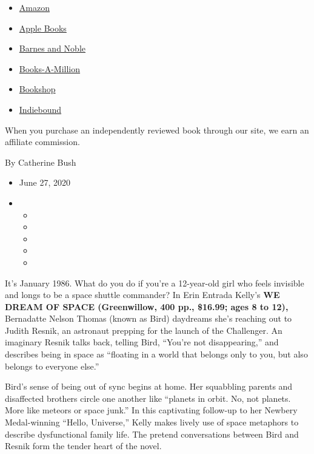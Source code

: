 \begin{itemize}
\tightlist
\item
  \href{https://www.amazon.com/gp/search?index=books\&tag=NYTBSREV-20\&field-keywords=We+Dream+of+Space+Erin+Entrada+Kelly}{Amazon}
\item
  \href{https://du-gae-books-dot-nyt-du-prd.appspot.com/buy?title=We+Dream+of+Space\&author=Erin+Entrada+Kelly}{Apple
  Books}
\item
  \href{https://www.anrdoezrs.net/click-7990613-11819508?url=https\%3A\%2F\%2Fwww.barnesandnoble.com\%2Fw\%2F\%3Fean\%3D9780062747303}{Barnes
  and Noble}
\item
  \href{https://www.anrdoezrs.net/click-7990613-35140?url=https\%3A\%2F\%2Fwww.booksamillion.com\%2Fp\%2FWe\%2BDream\%2Bof\%2BSpace\%2FErin\%2BEntrada\%2BKelly\%2F9780062747303}{Books-A-Million}
\item
  \href{https://bookshop.org/a/3546/9780062747303}{Bookshop}
\item
  \href{https://www.indiebound.org/book/9780062747303?aff=NYT}{Indiebound}
\end{itemize}

When you purchase an independently reviewed book through our site, we
earn an affiliate commission.

By Catherine Bush

\begin{itemize}
\item
  June 27, 2020
\item
  \begin{itemize}
  \item
  \item
  \item
  \item
  \item
  \end{itemize}
\end{itemize}

It's January 1986. What do you do if you're a 12-year-old girl who feels
invisible and longs to be a space shuttle commander? In Erin Entrada
Kelly's \textbf{WE DREAM OF SPACE (Greenwillow, 400 pp., \$16.99; ages 8
to 12),} Bernadatte Nelson Thomas (known as Bird) daydreams she's
reaching out to Judith Resnik, an astronaut prepping for the launch of
the Challenger. An imaginary Resnik talks back, telling Bird, ``You're
not disappearing,'' and describes being in space as ``floating in a
world that belongs only to you, but also belongs to everyone else.''

Bird's sense of being out of sync begins at home. Her squabbling parents
and disaffected brothers circle one another like ``planets in orbit. No,
not planets. More like meteors or space junk.'' In this captivating
follow-up to her Newbery Medal-winning ``Hello, Universe,'' Kelly makes
lively use of space metaphors to describe dysfunctional family life. The
pretend conversations between Bird and Resnik form the tender heart of
the novel.

